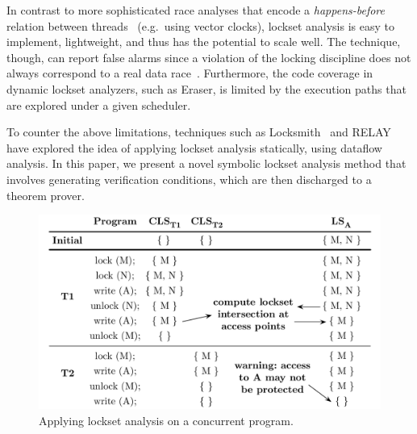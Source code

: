In contrast to more sophisticated race analyses that encode a \emph{happens-before} relation between threads~\cite{lamport1978time} (e.g.\ using vector clocks), lockset analysis is easy to implement, lightweight, and thus has the potential to scale well.  The technique, though, can report false alarms since a violation of the locking discipline does not always correspond to a real data race~\cite{savage1997eraser, pozniansky2003efficient, o2003hybrid, elmas2007goldilocks, flanagan2009fasttrack}. Furthermore, the code coverage in dynamic lockset analyzers, such as Eraser, is limited by the execution paths that are explored under a given scheduler.

To counter the above limitations, techniques such as Locksmith~\cite{pratikakis2006locksmith} and RELAY~\cite{voung2007relay} have explored the idea of applying lockset analysis statically, using dataflow analysis. In this paper, we present a novel symbolic lockset analysis method that involves generating verification conditions, which are then discharged to a theorem prover.

\begin{figure}[t]
\centering
\includegraphics[width=1\linewidth]{img/lockset.pdf}
\caption{Applying lockset analysis on a concurrent program.}
\label{fig:locksets}
\end{figure}
